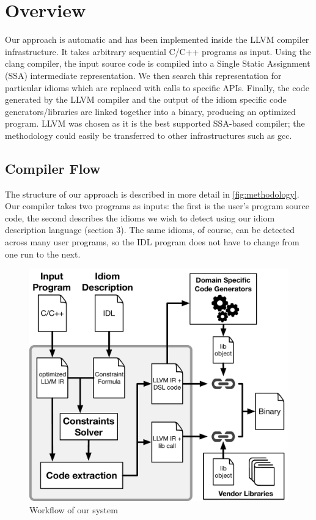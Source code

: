 \section{Overview}

    Our approach is automatic and has been implemented inside the LLVM compiler
    infrastructure.
    It takes arbitrary sequential C/C++ programs as input.
    Using the clang compiler, the input source code is compiled into a Single
    Static Assignment (SSA) intermediate representation.
    We then search this representation for particular idioms which are replaced
    with calls to specific APIs.
    Finally, the code generated by the LLVM compiler and the output of the idiom
    specific code generators/libraries are linked together into a binary,
    producing an optimized program.
    LLVM was chosen as it is the best supported SSA-based compiler;
    the methodology could easily be transferred to other infrastructures such as
    gcc.

\subsection{Compiler Flow}

    The structure of our approach is described in more detail in
    \autoref{fig:methodology}.
    Our compiler takes two programs as inputs: the first is the user's program
    source code, the second describes the idioms we wish to detect using our
    idiom description language (section 3).
    The same idioms, of course, can be detected across many user programs, so
    the IDL program does not have to change from one run to the next.

\begin{figure}[t]
    \centering
    \includegraphics[width=\linewidth]{figures/compiler_flow.pdf}
    \caption{Workflow of our system}
    \label{fig:methodology}
    \vspace{-0.5em}
\end{figure}

